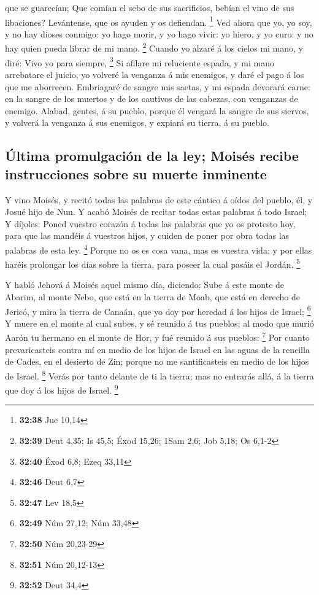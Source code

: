 que se guarecían;  Que comían el sebo de sus sacrificios,
bebían el vino de sus libaciones? Levántense, que os ayuden y os
defiendan. \footnote{\textbf{32:38} Jue 10,14}  Ved ahora
que yo, yo soy, y no hay dioses conmigo: yo hago morir, y yo hago vivir:
yo hiero, y yo curo: y no hay quien pueda librar de mi mano. \footnote{\textbf{32:39}
  Deut 4,35; Is 45,5; Éxod 15,26; 1Sam 2,6; Job 5,18; Os 6,1-2}
 Cuando yo alzaré á los cielos mi mano, y diré: Vivo yo
para siempre, \footnote{\textbf{32:40} Éxod 6,8; Ezeq 33,11}
 Si afilare mi reluciente espada, y mi mano arrebatare el
juicio, yo volveré la venganza á mis enemigos, y daré el pago á los que
me aborrecen.  Embriagaré de sangre mis saetas, y mi
espada devorará carne: en la sangre de los muertos y de los cautivos de
las cabezas, con venganzas de enemigo.  Alabad, gentes, á
su pueblo, porque él vengará la sangre de sus siervos, y volverá la
venganza á sus enemigos, y expiará su tierra, á su pueblo.

\hypertarget{uxfaltima-promulgaciuxf3n-de-la-ley-moisuxe9s-recibe-instrucciones-sobre-su-muerte-inminente}{%
\subsection{Última promulgación de la ley; Moisés recibe instrucciones
sobre su muerte
inminente}\label{uxfaltima-promulgaciuxf3n-de-la-ley-moisuxe9s-recibe-instrucciones-sobre-su-muerte-inminente}}

 Y vino Moisés, y recitó todas las palabras de este
cántico á oídos del pueblo, él, y Josué hijo de Nun.  Y
acabó Moisés de recitar todas estas palabras á todo Israel;
 Y díjoles: Poned vuestro corazón á todas las palabras
que yo os protesto hoy, para que las mandéis á vuestros hijos, y cuiden
de poner por obra todas las palabras de esta ley. \footnote{\textbf{32:46}
  Deut 6,7}  Porque no os es cosa vana, mas es vuestra
vida: y por ellas haréis prolongar los días sobre la tierra, para poseer
la cual pasáis el Jordán. \footnote{\textbf{32:47} Lev 18,5}

 Y habló Jehová á Moisés aquel mismo día, diciendo:
 Sube á este monte de Abarim, al monte Nebo, que está en
la tierra de Moab, que está en derecho de Jericó, y mira la tierra de
Canaán, que yo doy por heredad á los hijos de Israel; \footnote{\textbf{32:49}
  Núm 27,12; Núm 33,48}  Y muere en el monte al cual
subes, y sé reunido á tus pueblos; al modo que murió Aarón tu hermano en
el monte de Hor, y fué reunido á sus pueblos: \footnote{\textbf{32:50}
  Núm 20,23-29}  Por cuanto prevaricasteis contra mí en
medio de los hijos de Israel en las aguas de la rencilla de Cades, en el
desierto de Zin; porque no me santificasteis en medio de los hijos de
Israel. \footnote{\textbf{32:51} Núm 20,12-13}  Verás por
tanto delante de ti la tierra; mas no entrarás allá, á la tierra que doy
á los hijos de Israel. \footnote{\textbf{32:52} Deut 34,4}


